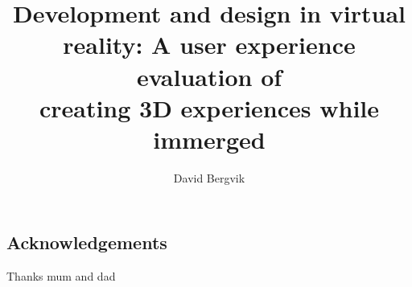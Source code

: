 \documentclass[a4paper,11pt,twoside]{report}
\title{Development and design in virtual reality: A user experience evaluation of \\creating 3D experiences while immerged}%
\author{David Bergvik}
\begin{document}
\maketitle


\begin{center}
\section*{Acknowledgements}
Thanks mum and dad 
\end{center}

\clearpage

\end{document}
